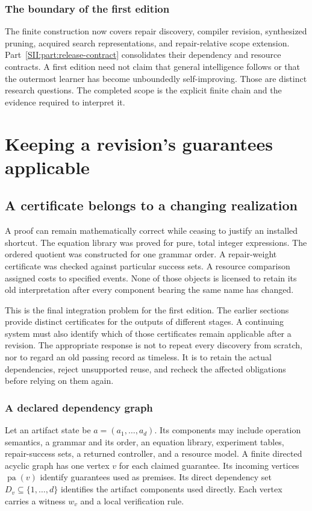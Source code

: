 \subsection{The boundary of the first edition}
The finite construction now covers repair discovery, compiler revision, synthesized pruning, acquired search representations, and repair-relative scope extension. Part~\ref{SII:part:release-contract} consolidates their dependency and resource contracts. A first edition need not claim that general intelligence follows or that the outermost learner has become unboundedly self-improving. Those are distinct research questions. The completed scope is the explicit finite chain and the evidence required to interpret it.


\chapter{Keeping a revision's guarantees applicable}\label{SII:book:chapter-64}
\label{SII:part:release-contract}
\section{A certificate belongs to a changing realization}\label{SII:sec:certificate-life}
A proof can remain mathematically correct while ceasing to justify an installed shortcut. The equation library was proved for pure, total integer expressions. The ordered quotient was constructed for one grammar order. A repair-weight certificate was checked against particular success sets. A resource comparison assigned costs to specified events. None of those objects is licensed to retain its old interpretation after every component bearing the same name has changed.

This is the final integration problem for the first edition. The earlier sections provide distinct certificates for the outputs of different stages. A continuing system must also identify which of those certificates remain applicable after a revision. The appropriate response is not to repeat every discovery from scratch, nor to regard an old passing record as timeless. It is to retain the actual dependencies, reject unsupported reuse, and recheck the affected obligations before relying on them again.

\subsection{A declared dependency graph}
Let an artifact state be $a=(a_1,\ldots,a_d)$. Its components may include operation semantics, a grammar and its order, an equation library, experiment tables, repair-success sets, a returned controller, and a resource model. A finite directed acyclic graph has one vertex $v$ for each claimed guarantee. Its incoming vertices $\operatorname{pa}(v)$ identify guarantees used as premises. Its direct dependency set $D_v\subseteq\{1,\ldots,d\}$ identifies the artifact components used directly. Each vertex carries a witness $w_v$ and a local verification rule.

